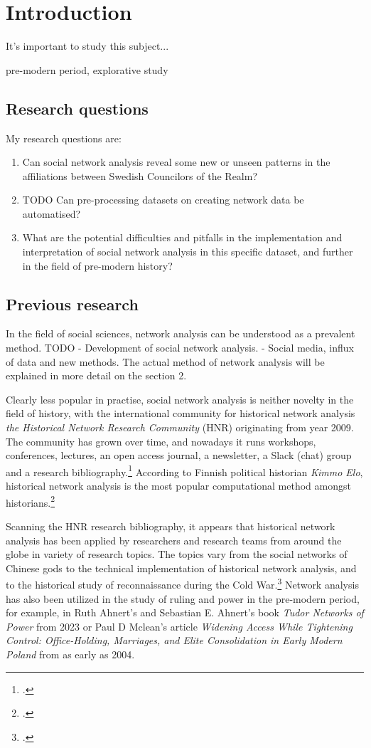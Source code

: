 \documentclass[a4paper,12pt]{article}
\begin{document}
\section{Introduction}

It's important to study this subject...

pre-modern period, explorative study

\subsection{Research questions}

My research questions are:
\begin{enumerate}
	\item Can social network analysis reveal some new or unseen patterns in the affiliations between Swedish Councilors of the Realm?
	\item TODO Can pre-processing datasets on creating network data be automatised?
	\item What are the potential difficulties and pitfalls in the implementation and interpretation of social network analysis in this specific dataset, and further in the field of pre-modern history?
\end{enumerate} 

\subsection{Previous research}
In the field of social sciences, network analysis can be understood as a prevalent method.
TODO
- Development of social network analysis. 
- Social media, influx of data and new methods.
The actual method of network analysis will be explained in more detail on the section 2. 

Clearly less popular in practise, social network analysis is neither novelty in the field of history, with the international community for historical network analysis \textit{the Historical Network Research Community} (HNR) originating from year 2009. The community has grown over time, and nowadays it runs workshops, conferences, lectures, an open access journal, a newsletter, a Slack (chat) group and a research bibliography.\footcite{hnr} According to Finnish political historian \textit{Kimmo Elo}, historical network analysis is the most popular computational method amongst historians.\footcite[p. 22.]{elo16} 

Scanning the HNR research bibliography, it appears that historical network analysis has been applied by researchers and research teams from around the globe in variety of research topics. The topics vary from the social networks of Chinese gods to the technical implementation of historical network analysis, and to the historical study of reconnaissance during the Cold War.\footcites[p. 22.]{elo16}{hnrbib} Network analysis has also been utilized in the study of ruling and power in the pre-modern period, for example, in Ruth Ahnert's and Sebastian E. Ahnert's book \textit{Tudor Networks of Power} from 2023 or Paul D Mclean's article \textit{Widening Access While Tightening Control: Office-Holding, Marriages, and Elite Consolidation in Early Modern Poland} from as early as 2004. 
\end{document}
